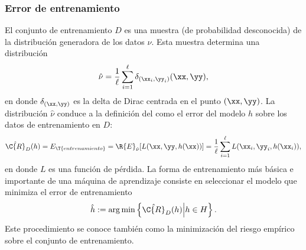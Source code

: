%
\subsubsection{Error de entrenamiento}
%
El conjunto de entrenamiento $D$ es una muestra (de probabilidad
desconocida) de la distribución generadora de los datos $\nu$.
Esta muestra determina una distribución 
%
\begin{align}
  \hat{\nu}=\frac{1}{\ell}\sum_{i=1}^{\ell}\delta_{(\xx_i,\yy_i)}(\xx,\yy),
\end{align}
%
en donde $\delta_{(\xx,\yy)}$ es la delta de Dirac centrada en el
punto $(\xx,\yy)$.
La distribución $\hat{\nu}$ conduce a la definición del
 como el error del modelo $h$ sobre los
datos de entrenamiento en $D$:
%
\begin{align}
  \hat{\C{R}}_D(h)=E_\T{entrenamiento}=\R{E}_{\hat{\nu}}[L(\xx,\yy,h(\xx))]
  =\frac{1}{\ell}\sum_{i=1}^\ell L(\xx_i, \yy_i, h(\xx_i)),
\end{align}
%
en donde $L$ es una función de pérdida.
La forma de entrenamiento más básica e importante de una máquina
de aprendizaje consiste en seleccionar el modelo que minimiza el
error de entrenamiento
%
\begin{align}
  \hat{h}:=\arg \min \left\{ \hat{\C{R}}_D(h)\middle|h \in H\right\}.
\end{align}
%
Este procedimiento se conoce también como la minimización del riesgo
empírico sobre el conjunto de entrenamiento.

